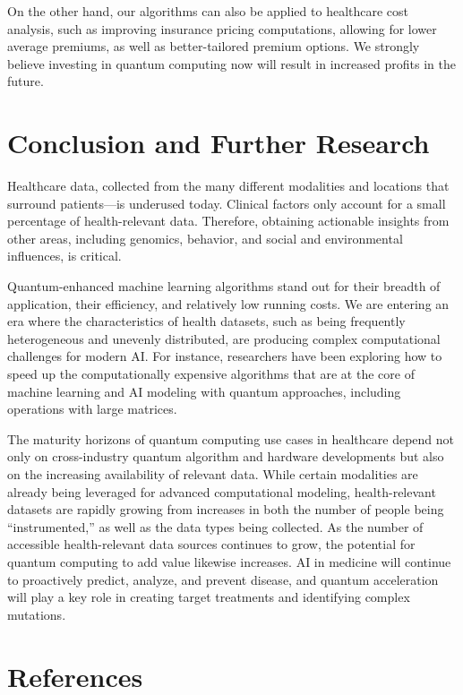 \documentclass{scrartcl}
\begin{document}
On the other hand, our algorithms can also be applied to healthcare cost analysis, such as improving insurance pricing computations, allowing for lower average premiums, as well as better-tailored premium options. We strongly believe investing in quantum computing now will result in increased profits in the future.

\section{Conclusion and Further Research}
\label{sec:org63bacf7}

Healthcare data, collected from the many different modalities and locations that surround patients—is underused today. Clinical factors only account for a small percentage of health-relevant data. Therefore, obtaining actionable insights from other areas, including genomics, behavior, and social and environmental influences, is critical.

Quantum-enhanced machine learning algorithms stand out for their breadth of application, their efficiency, and relatively low running costs. We are entering an era where the characteristics of health datasets, such as being frequently heterogeneous and unevenly distributed, are producing complex computational challenges for modern AI. For instance, researchers have been exploring how to speed up the computationally expensive algorithms that are at the core of machine learning and AI modeling with quantum approaches, including operations with large matrices.

The maturity horizons of quantum computing use cases in healthcare depend not only on cross-industry quantum algorithm and hardware developments but also on the increasing availability of relevant data. While certain modalities are already being leveraged for advanced computational modeling, health-relevant datasets are rapidly growing from increases in both the number of people being “instrumented,” as well as the data types being collected. As the number of accessible health-relevant data sources continues to grow, the potential for quantum computing to add value likewise increases. AI in medicine will continue to proactively predict, analyze, and prevent disease, and quantum acceleration will play a key role in creating target treatments and identifying complex mutations.

\section{References}
\label{sec:org5f0dea7}
\end{document}
